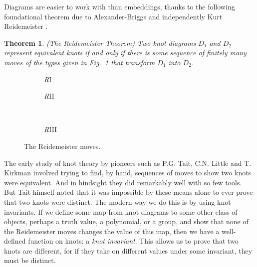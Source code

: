 \documentclass[12pt]{report}
\newtheorem*{theorem}{Theorem}
\theoremstyle{upright}
\begin{document}
Diagrams are easier to work with than embeddings, thanks to the following foundational theorem due to Alexander-Briggs  \cite{types-of-knotted-curves} and independently Kurt Reidemeister \cite{elementary-justification-knot-theory}.
\begin{theorem}(The Reidemeister Theorem)
Two knot diagrams $D_{1}$ and $D_{2}$ represent equivalent knots if and only if there is some sequence of finitely many moves of the types given in Fig.~\ref{fig:reidemeister_moves} that transform $D_{1}$ into $D_{2}$.
\end{theorem}

\begin{figure}[hbt!]
	\centering
	\hspace*{\fill}
	\begin{subfigure}[b]{0.35 \textwidth}
		\centering
		\def\svgscale{0.22}
		
		\caption{\textit{R}I}
	\end{subfigure}
	\hspace*{\fill}
	\begin{subfigure}[b]{0.35 \textwidth}
		\centering
		\def\svgscale{0.22}
		
		\caption{\textit{R}II}
	\end{subfigure}
	\hspace*{\fill}
	\\
	\hspace*{\fill}
	\begin{subfigure}[b]{0.35 \textwidth}
		\centering
		\def\svgscale{0.22}
		
		\caption{\textit{R}III}
	\end{subfigure}
	\hspace*{\fill}
	\caption{The Reidemeister moves.}
	\label{fig:reidemeister_moves}
\end{figure}


The early study of knot theory by pioneers such as P.G. Tait, C.N. Little and T. Kirkman involved trying to find, by hand, sequences of moves to show two knots were equivalent. And in hindsight they did remarkably well with so few tools. But Tait himself noted that it was impossible by these means alone to ever prove that two knots were distinct. The modern way we do this is by using knot invariants. If we define some map from knot diagrams to some other class of objects, perhaps a truth value, a polynomial, or a group, and show that none of the Reidemeister moves changes the value of this map, then we have a well-defined function on knots: a \textit{knot invariant}. This allows us to prove that two knots are different, for if they take on different values under some invariant, they must be distinct.
\end{document}
